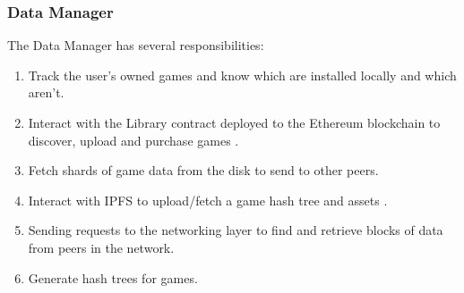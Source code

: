 \subsubsection{Data Manager}

The Data Manager has several responsibilities:

\begin{enumerate}
  \item Track the user's owned games and know which are installed locally and which aren't.
  \item Interact with the Library contract deployed to the Ethereum blockchain to discover, upload and purchase games   .
  \item Fetch shards of game data from the disk to send to other peers.
  \item Interact with IPFS to upload/fetch a game hash tree and assets  .
  \item Sending requests to the networking layer to find and retrieve blocks of data from peers in the network.
  \item Generate hash trees for games.
\end{enumerate}